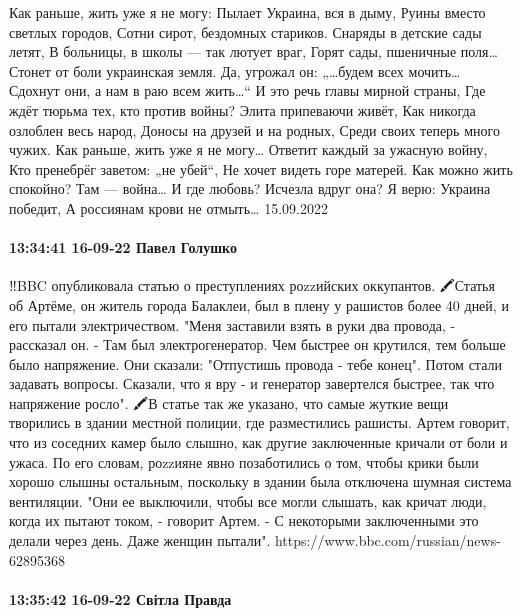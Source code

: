 Как раньше, жить уже я не могу:
Пылает Украина, вся в дыму,
Руины вместо светлых городов,
Сотни сирот, бездомных стариков.
Снаряды в детские сады летят,
В больницы, в школы — так лютует враг,
Горят сады, пшеничные поля…
Стонет от боли украинская земля.
Да, угрожал он: „…будем всех мочить…
Сдохнут они, а нам в раю всем жить…“
И это речь главы мирной страны,
Где ждёт тюрьма тех, кто против войны?
Элита припеваючи живёт,
Как никогда озлоблен весь народ,
Доносы на друзей и на родных,
Среди своих теперь много чужих.
Как раньше, жить уже я не могу…
Ответит каждый за ужасную войну,
Кто пренебрёг заветом: „не убей“,
Не хочет видеть горе матерей.
Как можно жить спокойно? Там — война…
И где любовь? Исчезла вдруг она?
Я верю: Украина победит,
А россиянам крови не отмыть…
15.09.2022

\paragraph{13:34:41 16-09-22 Павел Голушко}

‼️BBC опубликовала статью о преступлениях роzzийских оккупантов.
🖍Статья об Артёме, он житель города Балаклеи, был в плену у рашистов более 40 дней, и его пытали электричеством.
"Меня заставили взять в руки два провода, - рассказал он. - Там был электрогенератор. Чем быстрее он крутился, тем больше было напряжение. Они сказали: "Отпустишь провода - тебе конец". Потом стали задавать вопросы. Сказали, что я вру - и генератор завертелся быстрее, так что напряжение росло".
🖍В статье так же указано, что самые жуткие вещи творились в здании местной полиции, где разместились рашисты. Артем говорит, что из соседних камер было слышно, как другие заключенные кричали от боли и ужаса. По его словам, роzzияне явно позаботились о том, чтобы крики были хорошо слышны остальным, поскольку в здании была отключена шумная система вентиляции. "Они ее выключили, чтобы все могли слышать, как кричат люди, когда их пытают током, - говорит Артем. - С некоторыми заключенными это делали через день. Даже женщин пытали".
https://www.bbc.com/russian/news-62895368

\paragraph{13:35:42 16-09-22 Світла Правда}

